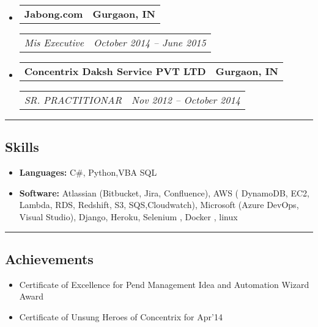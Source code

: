 \documentclass[11pt,letterpaper]{article}
\makeatletter
\newcommand{\headerrow}[2]
{\begin{tabular*}{\linewidth}{l@{\extracolsep{\fill}}r}
#1 &
#2 \\
\end{tabular*}}
\makeatother
\begin{document}
\begin{itemize}[leftmargin=1em]
	\item
	      \headerrow
	      {\textbf{Jabong.com}}
	      {\textbf{Gurgaon, IN}}
	      \headerrow
	      {\emph{Mis Executive}}
	      {\emph{October 2014 -- June 2015}}
	\item
	      \headerrow
	      {\textbf{Concentrix Daksh Service PVT LTD}}
	      {\textbf{Gurgaon, IN}}
	      \headerrow
	      {\emph{SR. PRACTITIONAR}}
	      {\emph{Nov 2012 -- October 2014}}
	      	      
\end{itemize}

\hrule
\vspace{-1em}
\subsection*{\Large Skills}

\begin{itemize}[leftmargin=1em,noitemsep]
	\item \textbf{Languages:}
	      C\#, Python,VBA SQL
	\item \textbf{Software:}
	      Atlassian (Bitbucket, Jira, Confluence), AWS ( DynamoDB, EC2, Lambda, RDS, Redshift, S3, SQS,Cloudwatch), Microsoft (Azure DevOps, Visual Studio),  Django, Heroku, Selenium , Docker , linux
\end{itemize}

\hrule
\vspace{-1em}
\subsection*{\Large Achievements}

\begin{itemize}[leftmargin=1em,noitemsep]
	\item Certificate of Excellence for Pend Management Idea and Automation Wizard Award
	\item Certificate of Unsung Heroes of Concentrix for Apr’14
\end{itemize}
\end{document}
